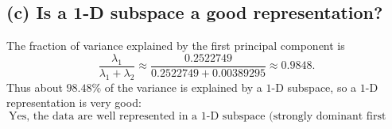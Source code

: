 \documentclass{article}
\begin{document}
\subsection*{(c) Is a 1-D subspace a good representation?}
The fraction of variance explained by the first principal component is
\[
\frac{\lambda_1}{\lambda_1+\lambda_2}
\approx \frac{0.2522749}{0.2522749+0.00389295}
\approx 0.9848.
\]
Thus about $98.48\%$ of the variance is explained by a $1$-D subspace, so a $1$-D representation is very good:
\[
\boxed{\ \text{Yes, the data are well represented in a 1-D subspace (strongly dominant first PC).}\ }
\]
\end{document}

